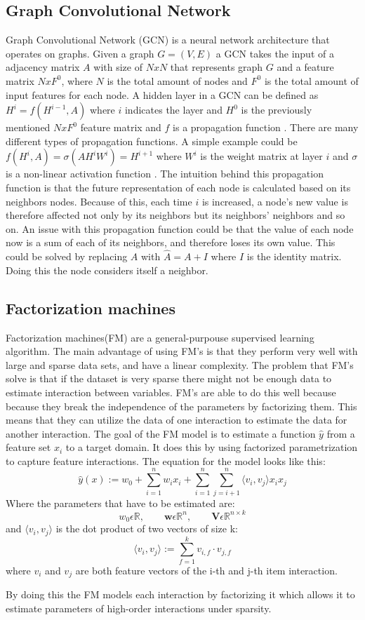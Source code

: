 \subsection{Graph Convolutional Network}
Graph Convolutional Network (GCN) is a neural network architecture that operates on graphs.
Given a graph $G = (V,E)$ a GCN takes the input of a adjacency
matrix $A$ with size of $N x N$ that represents graph $G$ and a feature matrix $N x F^0$, where $N$ is the total amount of nodes and $F^0$ is the total amount of input features for each node.
A hidden layer in a GCN can be defined as $H^i = f(H^{i-1}, A)$ where $i$ indicates the layer and $H^0$ is the previously mentioned $N x F^0$ feature matrix and $f$ is a propagation function \cite{Deep-Learning-on-Graphs-with-GCN}.
There are many different types of propagation functions.
A simple example could be $f(H^i, A) = \sigma(AH^iW^i) = H^{i+1}$ where $W^i$ is the weight matrix at layer $i$ and $\sigma$ is a non-linear activation function \cite{Deep-Learning-on-Graphs-with-GCN}.
The intuition behind this propagation function is that the future representation of each node is calculated based on its neighbors nodes.
Because of this, each time $i$ is increased, a node's new value is therefore affected not only by its neighbors but its neighbors' neighbors and so on.
An issue with this propagation function could be that the value of each node now is a sum of each of its neighbors, and therefore loses its own value.
This could be solved by replacing $A$ with $\hat{A} = A + I$ where $I$ is the identity matrix.
Doing this the node considers itself a neighbor.

\subsection{Factorization machines}
Factorization machines(FM) are a general-purpouse supervised learning algorithm.
The main advantage of using FM's is that they perform very well with large and sparse data sets, and have a linear complexity.
The problem that FM's solve is that if the dataset is very sparse there might not be enough data to estimate interaction between variables.
FM's are able to do this well because because they break the independence of the parameters by factorizing them.
This means that they can utilize the data of one interaction to estimate the data for another interaction.
The goal of the FM model is to estimate a function $\hat{y}$ from a feature set $x_i$ to a target domain. 
It does this by using factorized parametrization to capture feature interactions.
The equation for the model looks like this:
\[ \hat{y}(x) := w_0 + \sum_{i=1}^{n} w_ix_i + \sum_{i=1}^{n}\sum_{j=i+1}^{n} \big \langle v_i,v_j \big \rangle x_ix_j \]
Where the parameters that have to be estimated are:
\[ w_0 \epsilon \mathbb{R}, \qquad \mathbf{w} \epsilon \mathbb{R}^n, \qquad  \mathbf{V}\epsilon \mathbb{R}^{n \times k} \]
and $\big \langle v_i,v_j \big \rangle$ is the dot product of two vectors of size k:
\[ \big \langle v_i,v_j \big \rangle := \sum_{f=1}^{k} v_{i,f} \cdot v_{j,f}\]
where $v_i$ and $v_j$ are both feature vectors of the i-th and j-th item interaction.

By doing this the FM models each interaction by factorizing it which allows it to estimate parameters of high-order interactions under sparsity.

